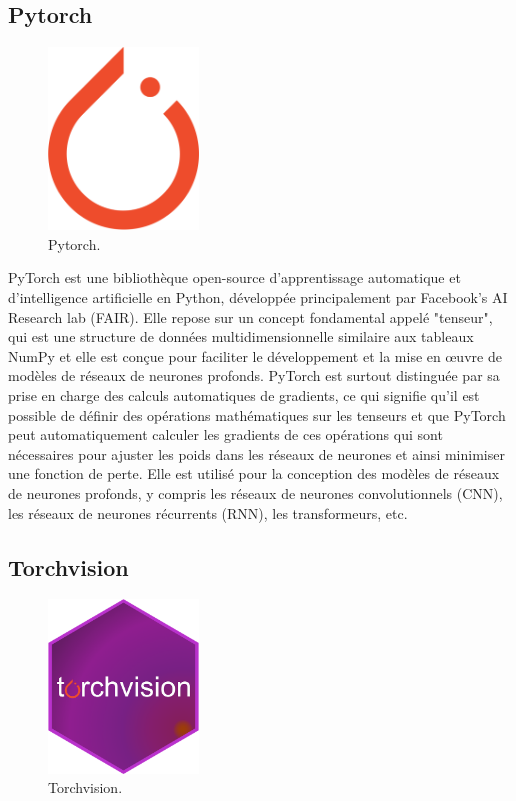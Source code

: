 \subsection{Pytorch}

\begin{figure}[hbt!]
  \centering
  \includegraphics[width=4cm]{images_pfe/pytorch.png}
  \caption{Pytorch.}
  \label{fig:pytorch}
\end{figure}
\FloatBarrier
\medskip

PyTorch est une bibliothèque open-source d'apprentissage automatique et d'intelligence artificielle en Python, développée principalement par Facebook's AI Research lab (FAIR). Elle repose sur un concept fondamental appelé "tenseur", qui est une structure de données multidimensionnelle similaire aux tableaux NumPy et elle est conçue pour faciliter le développement et la mise en œuvre de modèles de réseaux de neurones profonds. PyTorch est surtout distinguée par sa prise en charge des calculs automatiques de gradients, ce qui signifie qu'il est possible de définir des opérations mathématiques sur les tenseurs et que PyTorch peut automatiquement calculer les gradients de ces opérations qui sont nécessaires pour ajuster les poids dans les réseaux de neurones et ainsi minimiser une fonction de perte. Elle est utilisé pour la conception des modèles de réseaux de neurones profonds, y compris les réseaux de neurones convolutionnels (CNN), les réseaux de neurones récurrents (RNN), les transformeurs, etc.

\subsection{Torchvision}

\begin{figure}[hbt!]
  \centering
  \includegraphics[width=4cm]{images_pfe/torchvision.png}
  \caption{Torchvision.}
  \label{fig:torchvision}
\end{figure}
\FloatBarrier
\medskip

